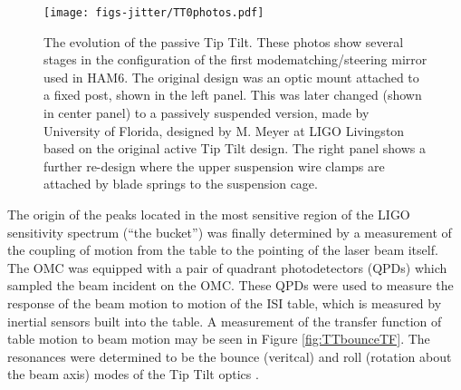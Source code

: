 \begin{figure}
  \begin{center}
  \leavevmode
  \texttt{[image: figs-jitter/TT0photos.pdf]}
  \end{center}
  \caption[The evolution of the passive Tip Tilt.]{The evolution of the passive Tip Tilt. These photos show several stages in the configuration of the first modematching/steering mirror used in HAM6. The original design was an optic mount attached to a fixed post, shown in the left panel. This was later changed (shown in center panel) to a passively suspended version, made by University of Florida, designed by M. Meyer at LIGO Livingston based on the original active Tip Tilt design. The right panel shows a further re-design where the upper suspension wire clamps are attached by blade springs to the suspension cage.}
  \label{fig:TT0photos}
\end{figure}

The origin of the peaks located in the most sensitive region of the LIGO sensitivity spectrum (``the bucket'') was finally determined by a measurement of the coupling of motion from the table to the pointing of the laser beam itself. %
The OMC was equipped with a pair of quadrant photodetectors (QPDs) which sampled the beam incident on the OMC. %
These QPDs were used to measure the response of the beam motion to motion of the ISI table, which is measured by inertial sensors built into the table. %
A measurement of the transfer function of table motion to beam motion may be seen in Figure \ref{fig:TTbounceTF}. %
The resonances were determined to be the bounce (veritcal) and roll (rotation about the beam axis) modes of the Tip Tilt optics \cite{tt1bounce}.


